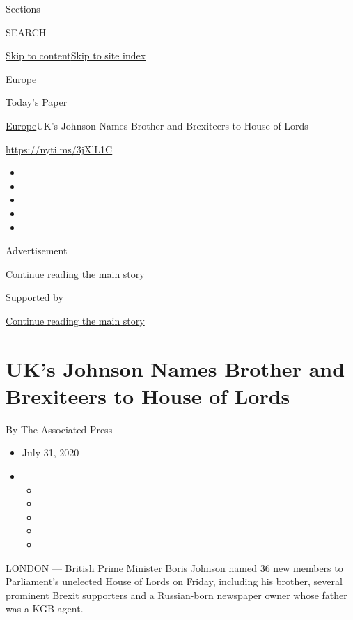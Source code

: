 Sections

SEARCH

\protect\hyperlink{site-content}{Skip to
content}\protect\hyperlink{site-index}{Skip to site index}

\href{https://www.nytimes.com/section/world/europe}{Europe}

\href{https://myaccount.nytimes.com/auth/login?response_type=cookie\&client_id=vi}{}

\href{https://www.nytimes.com/section/todayspaper}{Today's Paper}

\href{/section/world/europe}{Europe}\textbar{}UK's Johnson Names Brother
and Brexiteers to House of Lords

\url{https://nyti.ms/3jXlL1C}

\begin{itemize}
\item
\item
\item
\item
\item
\end{itemize}

Advertisement

\protect\hyperlink{after-top}{Continue reading the main story}

Supported by

\protect\hyperlink{after-sponsor}{Continue reading the main story}

\hypertarget{uks-johnson-names-brother-and-brexiteers-to-house-of-lords}{%
\section{UK's Johnson Names Brother and Brexiteers to House of
Lords}\label{uks-johnson-names-brother-and-brexiteers-to-house-of-lords}}

By The Associated Press

\begin{itemize}
\item
  July 31, 2020
\item
  \begin{itemize}
  \item
  \item
  \item
  \item
  \item
  \end{itemize}
\end{itemize}

LONDON --- British Prime Minister Boris Johnson named 36 new members to
Parliament's unelected House of Lords on Friday, including his brother,
several prominent Brexit supporters and a Russian-born newspaper owner
whose father was a KGB agent.

